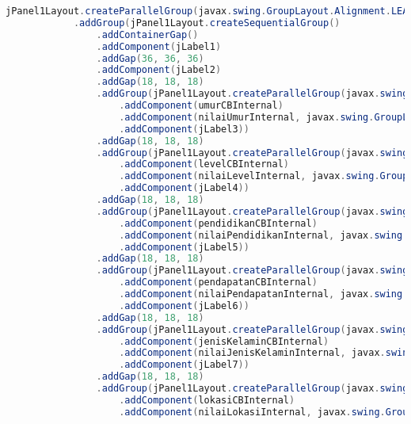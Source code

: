 \begin{lstlisting}[language=Java, caption=TampilanBobotKetetanggaan.java]
            jPanel1Layout.createParallelGroup(javax.swing.GroupLayout.Alignment.LEADING)
            .addGroup(jPanel1Layout.createSequentialGroup()
                .addContainerGap()
                .addComponent(jLabel1)
                .addGap(36, 36, 36)
                .addComponent(jLabel2)
                .addGap(18, 18, 18)
                .addGroup(jPanel1Layout.createParallelGroup(javax.swing.GroupLayout.Alignment.BASELINE)
                    .addComponent(umurCBInternal)
                    .addComponent(nilaiUmurInternal, javax.swing.GroupLayout.PREFERRED_SIZE, javax.swing.GroupLayout.DEFAULT_SIZE, javax.swing.GroupLayout.PREFERRED_SIZE)
                    .addComponent(jLabel3))
                .addGap(18, 18, 18)
                .addGroup(jPanel1Layout.createParallelGroup(javax.swing.GroupLayout.Alignment.BASELINE)
                    .addComponent(levelCBInternal)
                    .addComponent(nilaiLevelInternal, javax.swing.GroupLayout.PREFERRED_SIZE, javax.swing.GroupLayout.DEFAULT_SIZE, javax.swing.GroupLayout.PREFERRED_SIZE)
                    .addComponent(jLabel4))
                .addGap(18, 18, 18)
                .addGroup(jPanel1Layout.createParallelGroup(javax.swing.GroupLayout.Alignment.BASELINE)
                    .addComponent(pendidikanCBInternal)
                    .addComponent(nilaiPendidikanInternal, javax.swing.GroupLayout.PREFERRED_SIZE, javax.swing.GroupLayout.DEFAULT_SIZE, javax.swing.GroupLayout.PREFERRED_SIZE)
                    .addComponent(jLabel5))
                .addGap(18, 18, 18)
                .addGroup(jPanel1Layout.createParallelGroup(javax.swing.GroupLayout.Alignment.BASELINE)
                    .addComponent(pendapatanCBInternal)
                    .addComponent(nilaiPendapatanInternal, javax.swing.GroupLayout.PREFERRED_SIZE, javax.swing.GroupLayout.DEFAULT_SIZE, javax.swing.GroupLayout.PREFERRED_SIZE)
                    .addComponent(jLabel6))
                .addGap(18, 18, 18)
                .addGroup(jPanel1Layout.createParallelGroup(javax.swing.GroupLayout.Alignment.BASELINE)
                    .addComponent(jenisKelaminCBInternal)
                    .addComponent(nilaiJenisKelaminInternal, javax.swing.GroupLayout.PREFERRED_SIZE, javax.swing.GroupLayout.DEFAULT_SIZE, javax.swing.GroupLayout.PREFERRED_SIZE)
                    .addComponent(jLabel7))
                .addGap(18, 18, 18)
                .addGroup(jPanel1Layout.createParallelGroup(javax.swing.GroupLayout.Alignment.BASELINE)
                    .addComponent(lokasiCBInternal)
                    .addComponent(nilaiLokasiInternal, javax.swing.GroupLayout.PREFERRED_SIZE, javax.swing.GroupLayout.DEFAULT_SIZE, javax.swing.GroupLayout.PREFERRED_SIZE)

\end{lstlisting}

